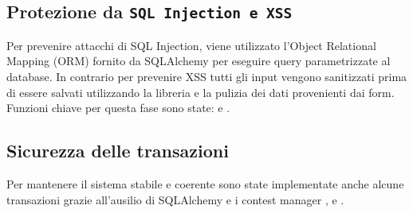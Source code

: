\documentclass{report}
\begin{document}
\subsection{Protezione da \texttt{SQL Injection e XSS} }
Per prevenire attacchi di SQL Injection, viene utilizzato l'Object Relational Mapping (ORM) fornito da SQLAlchemy per eseguire query parametrizzate al database.  In contrario per prevenire XSS tutti gli input vengono sanitizzati prima di essere salvati utilizzando la libreria   e  la pulizia dei dati provenienti dai form.  Funzioni chiave per questa fase sono state:  e .

\subsection{Sicurezza delle transazioni }
Per mantenere il sistema stabile e coerente sono state implementate anche alcune transazioni grazie all'ausilio di SQLAlchemy e i contest manager  ,  e .
\end{document}
